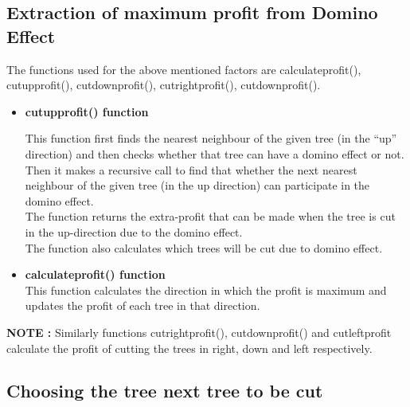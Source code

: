 \documentclass[12pt]{article}
\begin{document}
\subsection{Extraction of maximum profit from Domino Effect}
The functions used for the above mentioned factors are calculate\textunderscore profit(), cutup\textunderscore profit(), cutdown\textunderscore profit(), cutright\textunderscore profit(), cutdown\textunderscore profit().
    \begin{itemize}
        \item \textbf{cutup\textunderscore profit() function}
        
            This function first finds the nearest neighbour of the given tree (in the “up” direction) and then checks whether that tree can have a domino effect or not.\\
            
            Then it makes a recursive call to find that whether the next nearest neighbour of the given tree (in the up direction) can participate in the domino effect. \\
            
            The function returns the extra-profit that can be made when the tree is cut in the up-direction due to the domino effect.\\
			
			The function also calculates which trees will be cut due to domino effect.
        
        \item \textbf{calculate\textunderscore profit() function}  \\
        
            This function calculates the direction in which the profit is maximum and updates the profit of each tree in that direction. \\
            
    \end{itemize}
	
	\textbf{NOTE :} Similarly functions cutright\textunderscore profit(), cutdown\textunderscore profit() and cutleft\textunderscore profit calculate the profit of cutting the trees in right, down and left respectively.\\
\newpage
\subsection{Choosing the tree next tree to be cut}
\end{document}
